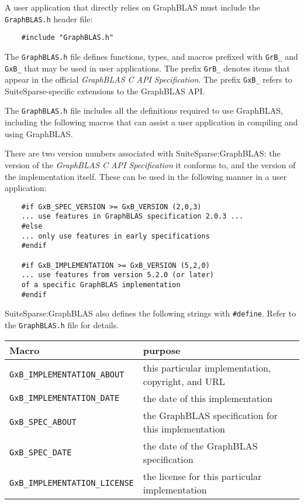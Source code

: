 \documentclass[12pt]{article}
\begin{document}
A user application that directly relies on GraphBLAS must include the
\verb'GraphBLAS.h' header file:

\begin{mdframed}[userdefinedwidth=6in]
{\footnotesize
\begin{verbatim}
    #include "GraphBLAS.h"
\end{verbatim}
} \end{mdframed}

The \verb'GraphBLAS.h' file defines functions, types, and macros prefixed with
\verb'GrB_' and \verb'GxB_' that may be used in user applications.  The prefix
\verb'GrB_' denotes items that appear in the official {\em GraphBLAS C API
Specification}.  The prefix \verb'GxB_' refers to SuiteSparse-specific
extensions to the GraphBLAS API.

The \verb'GraphBLAS.h' file includes all the definitions required to use
GraphBLAS, including the following macros that can assist a user application in
compiling and using GraphBLAS.

There are two version numbers associated with SuiteSparse:GraphBLAS:
the version of the {\em GraphBLAS C API Specification} it
conforms to, and the version of the implementation itself.  These can
be used in the following manner in a user application:

{\footnotesize
\begin{verbatim}
    #if GxB_SPEC_VERSION >= GxB_VERSION (2,0,3)
    ... use features in GraphBLAS specification 2.0.3 ...
    #else
    ... only use features in early specifications
    #endif

    #if GxB_IMPLEMENTATION >= GxB_VERSION (5,2,0)
    ... use features from version 5.2.0 (or later)
    of a specific GraphBLAS implementation
    #endif \end{verbatim}}

SuiteSparse:GraphBLAS also defines the following strings with \verb'#define'.
Refer to the \verb'GraphBLAS.h' file for details.

\vspace{0.2in}
{\footnotesize
\begin{tabular}{ll}
\hline
Macro                & purpose                                      \\
\hline
\verb'GxB_IMPLEMENTATION_ABOUT'
    & this particular implementation, copyright, and URL \\
\verb'GxB_IMPLEMENTATION_DATE'
    & the date of this implementation \\
\verb'GxB_SPEC_ABOUT'
    & the GraphBLAS specification for this implementation \\
\verb'GxB_SPEC_DATE'
    & the date of the GraphBLAS specification \\
\verb'GxB_IMPLEMENTATION_LICENSE'
    & the license for this particular implementation \\
\hline
\end{tabular}
}
\vspace{0.2in}
\end{document}
